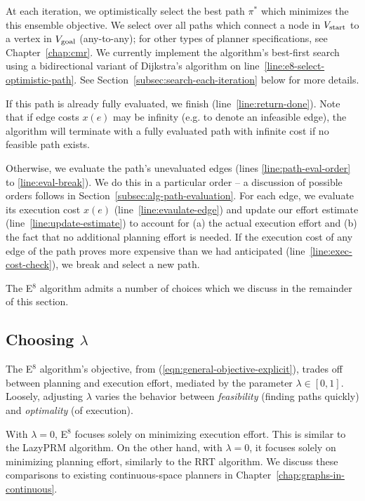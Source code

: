 At each iteration,
we optimistically select the best path $\pi^*$
which minimizes the this ensemble objective.
We select over all paths which connect
a node in $V_{\mbox{\scriptsize start}}$
to a vertex in $V_{\mbox{\scriptsize goal}}$
(any-to-any);
for other types of planner specifications,
see Chapter~\ref{chap:cmr}.
We currently implement the algorithm's best-first search
using a bidirectional variant of
Dijkstra's algorithm \cite{dijkstra1959anote}
on line~\ref{line:e8-select-optimistic-path}.
See Section~\ref{subsec:search-each-iteration} below
for more details.

If this path is already fully evaluated,
we finish (line~\ref{line:return-done}).
Note that if edge costs $x(e)$ may be infinity
(e.g. to denote an infeasible edge),
the algorithm will terminate with a fully evaluated path
with infinite cost if no feasible path exists.

Otherwise,
we evaluate the path's unevaluated edges
(lines \ref{line:path-eval-order}
to \ref{line:eval-break}).
We do this in a particular order --
a discussion of possible orders follows in 
Section~\ref{subsec:alg-path-evaluation}.
For each edge,
we evaluate its execution cost $x(e)$ (line~\ref{line:evaulate-edge})
and update our effort estimate (line~\ref{line:update-estimate})
to account for (a) the actual execution effort
and (b) the fact that no additional planning effort is needed.
If the execution cost of any edge of the path proves
more expensive than we had anticipated
(line~\ref{line:exec-cost-check}),
we break and select a new path.

The E$^8$ algorithm admits a number of choices
which we discuss in the remainder of this section.

\subsection{Choosing $\lambda$}
\label{subsec:choosing-lambda}

The E$^8$ algorithm's objective,
from (\ref{eqn:general-objective-explicit}),
trades off between planning and execution effort,
mediated by the parameter $\lambda \in [0,1]$.
Loosely,
adjusting $\lambda$ varies the behavior between
\emph{feasibility} (finding paths quickly)
and \emph{optimality} (of execution).

With $\lambda=0$,
E$^8$ focuses solely on minimizing execution effort.
This is similar to the LazyPRM algorithm.
On the other hand,
with $\lambda=0$,
it focuses solely on minimizing planning effort,
similarly to the RRT algorithm.
We discuss these comparisons to existing continuous-space planners
in Chapter~\ref{chap:graphs-in-continuous}.


